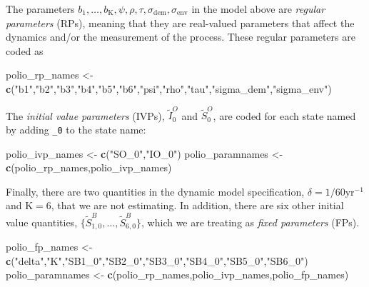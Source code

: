 \documentclass[]{article}
\newenvironment{Shaded}{\begin{snugshade}}{\end{snugshade}}
\newcommand{\KeywordTok}[1]{\textcolor[rgb]{0.13,0.29,0.53}{\textbf{#1}}}
\newcommand{\StringTok}[1]{\textcolor[rgb]{0.31,0.60,0.02}{#1}}
\newcommand{\NormalTok}[1]{#1}
\begin{document}
The parameters
\(b_1,\dots,b_\mathrm{K},\psi,\rho,\tau,\sigma_\mathrm{dem}, \sigma_\mathrm{env}\)
in the model above are \emph{regular parameters} (RPs), meaning that
they are real-valued parameters that affect the dynamics and/or the
measurement of the process. These regular parameters are coded as

\begin{Shaded}
\begin{Highlighting}[]
\NormalTok{polio_rp_names <-}\StringTok{ }\KeywordTok{c}\NormalTok{(}\StringTok{"b1"}\NormalTok{,}\StringTok{"b2"}\NormalTok{,}\StringTok{"b3"}\NormalTok{,}\StringTok{"b4"}\NormalTok{,}\StringTok{"b5"}\NormalTok{,}\StringTok{"b6"}\NormalTok{,}\StringTok{"psi"}\NormalTok{,}\StringTok{"rho"}\NormalTok{,}\StringTok{"tau"}\NormalTok{,}\StringTok{"sigma_dem"}\NormalTok{,}\StringTok{"sigma_env"}\NormalTok{)}
\end{Highlighting}
\end{Shaded}

The \emph{initial value parameters} (IVPs), \(\tilde I^O_{0}\) and
\(\tilde S^O_{0}\), are coded for each state named by adding
\texttt{\_0} to the state name:

\begin{Shaded}
\begin{Highlighting}[]
\NormalTok{polio_ivp_names <-}\StringTok{ }\KeywordTok{c}\NormalTok{(}\StringTok{"SO_0"}\NormalTok{,}\StringTok{"IO_0"}\NormalTok{)}
\NormalTok{polio_paramnames <-}\StringTok{ }\KeywordTok{c}\NormalTok{(polio_rp_names,polio_ivp_names)}
\end{Highlighting}
\end{Shaded}

Finally, there are two quantities in the dynamic model specification,
\(\delta=1/60 \mathrm{yr}^{-1}\) and \(\mathrm{K}=6\), that we are not
estimating. In addition, there are six other initial value quantities,
\(\{\tilde S^B_{1,0},\dots,\tilde S^B_{6,0}\}\), which we are treating
as \emph{fixed parameters} (FPs).

\begin{Shaded}
\begin{Highlighting}[]
\NormalTok{polio_fp_names <-}\StringTok{ }\KeywordTok{c}\NormalTok{(}\StringTok{"delta"}\NormalTok{,}\StringTok{"K"}\NormalTok{,}\StringTok{"SB1_0"}\NormalTok{,}\StringTok{"SB2_0"}\NormalTok{,}\StringTok{"SB3_0"}\NormalTok{,}\StringTok{"SB4_0"}\NormalTok{,}\StringTok{"SB5_0"}\NormalTok{,}\StringTok{"SB6_0"}\NormalTok{)}
\NormalTok{polio_paramnames <-}\StringTok{ }\KeywordTok{c}\NormalTok{(polio_rp_names,polio_ivp_names,polio_fp_names)}
\end{Highlighting}
\end{Shaded}
\end{document}
